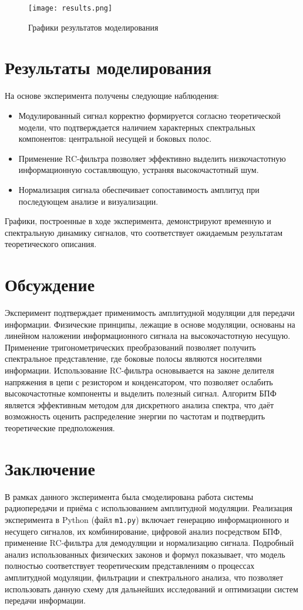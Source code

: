 \documentclass[12pt]{article}
\begin{document}
\begin{figure}[H]
\centering
\texttt{[image: results.png]}
\caption{Графики результатов моделирования}
\label{fig:results}
\end{figure}

\section{Результаты моделирования}
На основе эксперимента получены следующие наблюдения:
\begin{itemize}
    \item Модулированный сигнал корректно формируется согласно теоретической модели, что подтверждается наличием характерных спектральных компонентов: центральной несущей и боковых полос.
    \item Применение RC-фильтра позволяет эффективно выделить низкочастотную информационную составляющую, устраняя высокочастотный шум.
    \item Нормализация сигнала обеспечивает сопоставимость амплитуд при последующем анализе и визуализации.
\end{itemize}
Графики, построенные в ходе эксперимента, демонстрируют временную и спектральную динамику сигналов, что соответствует ожидаемым результатам теоретического описания.

\section{Обсуждение}
Эксперимент подтверждает применимость амплитудной модуляции для передачи информации. Физические принципы, лежащие в основе модуляции, основаны на линейном наложении информационного сигнала на высокочастотную несущую. Применение тригонометрических преобразований позволяет получить спектральное представление, где боковые полосы являются носителями информации. Использование RC-фильтра основывается на законе делителя напряжения в цепи с резистором и конденсатором, что позволяет ослабить высокочастотные компоненты и выделить полезный сигнал. Алгоритм БПФ является эффективным методом для дискретного анализа спектра, что даёт возможность оценить распределение энергии по частотам и подтвердить теоретические предположения.

\section{Заключение}
В рамках данного эксперимента была смоделирована работа системы радиопередачи и приёма с использованием амплитудной модуляции. Реализация эксперимента в Python (файл \texttt{m1.py}) включает генерацию информационного и несущего сигналов, их комбинирование, цифровой анализ посредством БПФ, применение RC-фильтра для демодуляции и нормализацию сигнала. Подробный анализ использованных физических законов и формул показывает, что модель полностью соответствует теоретическим представлениям о процессах амплитудной модуляции, фильтрации и спектрального анализа, что позволяет использовать данную схему для дальнейших исследований и оптимизации систем передачи информации.
\end{document}
